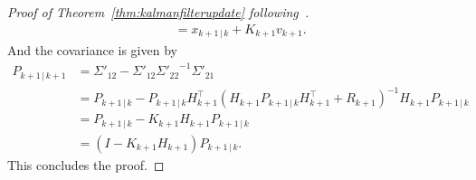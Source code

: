 \begin{proof}[Proof of Theorem~\ref{thm:kalmanfilterupdate} following~\cite{sarkka}]
\begin{align*}
                                                &= x_{k+1 \, \vert \, k} + K_{k+1}v_{k+1}.
    \end{align*}
    And the covariance is given by
    \begin{align*}
    P_{k+1 \, \vert \, k+1} &=\Sigma'_{12} - \Sigma'_{12} {\Sigma'_{22}}^{-1} \Sigma'_{21}\\
        &= P_{k+1 \, \vert \, k} - P_{k+1 \, \vert \, k} H_{k+1}^{\top} (H_{k+1} P_{k+1 \, \vert \, k} H_{k+1}^{\top} + R_{k+1})^{-1} H_{k+1}P_{k+1 \, \vert \, k}\\
        &= P_{k+1 \, \vert \, k} - K_{k+1} H_{k+1}P_{k+1 \, \vert \, k}\\
        &= (I -  K_{k+1} H_{k+1}) P_{k+1 \, \vert \, k}.
    \end{align*}
    This concludes the proof.
\end{proof}
